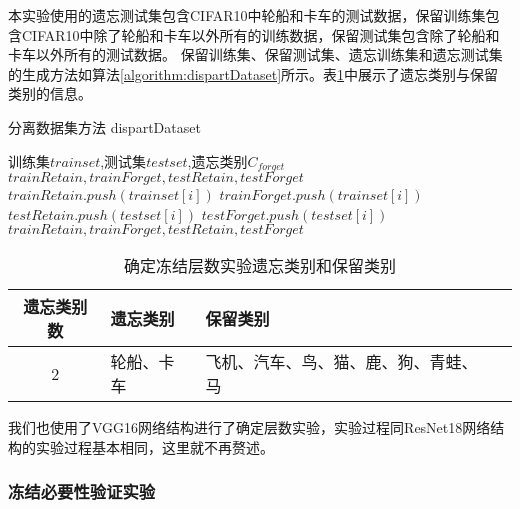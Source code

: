 本实验使用的遗忘测试集包含CIFAR10中轮船和卡车的测试数据，保留训练集包含CIFAR10中除了轮船和卡车以外所有的训练数据，保留测试集包含除了轮船和卡车以外所有的测试数据。
保留训练集、保留测试集、遗忘训练集和遗忘测试集的生成方法如算法\ref{algorithm:dispartDataset}所示。表\ref{tab:forget-continuous-2-kinds}中展示了遗忘类别与保留类别的信息。
\begin{algorithm}
	\renewcommand{\algorithmicrequire}{\textbf{Input:}}
	\renewcommand{\algorithmicensure}{\textbf{Output:}}
	\caption{分离数据集方法  dispartDataset}
	\label{algorithm:dispartDataset}
	\begin{algorithmic}[1]
        \REQUIRE 训练集$trainset$,测试集$testset$,遗忘类别$C_{forget}$
        \ENSURE  $trainRetain,trainForget,testRetain,testForget$
                \STATE $ trainRetain.push(trainset[i])$
            \ELSE
                \STATE $ trainForget.push(trainset[i])$
            \ENDIF
                \STATE $ testRetain.push(testset[i])$
            \ELSE
                \STATE $ testForget.push(testset[i])$
            \ENDIF
        \ENDFOR
        \RETURN $trainRetain,trainForget,testRetain,testForget$
	\end{algorithmic}  
\end{algorithm}
\begin{table}
    \centering
    \caption{确定冻结层数实验遗忘类别和保留类别}
    \begin{tabular}{cp{3cm}p{7cm}p{7cm}}
      \toprule 
      遗忘类别数  & 遗忘类别 & 保留类别  \\
      \midrule
      2 & 轮船、卡车  & 飞机、汽车、鸟、猫、鹿、狗、青蛙、马  \\
      \bottomrule
    \end{tabular}
    \label{tab:forget-continuous-2-kinds}
\end{table}
我们也使用了VGG16网络结构进行了确定层数实验，实验过程同ResNet18网络结构的实验过程基本相同，这里就不再赘述。

\subsubsection{冻结必要性验证实验}

